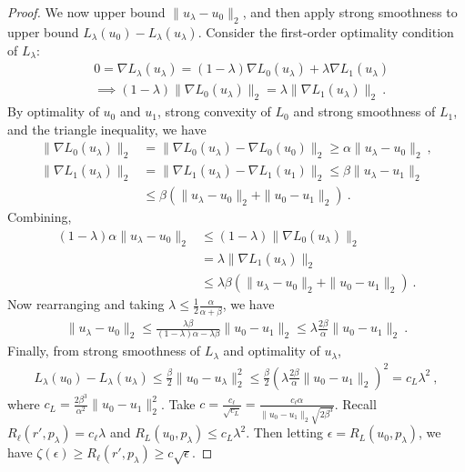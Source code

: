 \documentclass{article}
\theoremstyle{definition}\newtheorem{definition}{Definition}
\theoremstyle{definition}\newtheorem{assumption}{Assumption}
\begin{document}
\begin{proof}
  We now upper bound $\|u_\lambda - u_0\|_2$, and then apply strong smoothness to upper bound $L_\lambda(u_0) - L_\lambda(u_\lambda)$.
  Consider the first-order optimality condition of $L_\lambda$:
  \begin{align*}
    \label{eq:first-order-opt-smooth}
    & 0 = \nabla L_\lambda(u_\lambda) = (1-\lambda) \nabla L_0(u_\lambda) + \lambda \nabla L_1(u_\lambda)
    \\
    & \implies (1-\lambda) \|\nabla L_0(u_\lambda)\|_2 = \lambda \|\nabla L_1(u_\lambda)\|_2~.
  \end{align*}
  By optimality of $u_0$ and $u_1$, strong convexity of $L_0$ and strong smoothness of $L_1$, and the triangle inequality, we have
  \begin{align*}
    \|\nabla L_0(u_\lambda)\|_2 &= \|\nabla L_0(u_\lambda) - \nabla L_0(u_0)\|_2 \geq \alpha \|u_\lambda - u_0\|_2~,
    \\
    \|\nabla L_1(u_\lambda)\|_2 &= \|\nabla L_1(u_\lambda) - \nabla L_1(u_1)\|_2 \leq \beta \|u_\lambda - u_1\|_2
    \\
    &\leq \beta \left( \|u_\lambda - u_0\|_2 + \|u_0 - u_1\|_2 \right)~.
  \end{align*}
  Combining,
  \begin{align*}
    (1-\lambda) \alpha \|u_\lambda - u_0\|_2
    &\leq
      (1-\lambda) \|\nabla L_0(u_\lambda)\|_2
    \\
    &= \lambda \|\nabla L_1(u_\lambda)\|_2
    \\
    &\leq
      \lambda \beta \left( \|u_\lambda - u_0\|_2 + \|u_0 - u_1\|_2 \right)~.
  \end{align*}
  Now rearranging and taking $\lambda \leq \tfrac 1 2 \tfrac {\alpha}{\alpha+\beta}$, we have
  \begin{align*}
    \|u_\lambda - u_0\|_2 \leq \frac{\lambda\beta}{(1-\lambda)\alpha-\lambda\beta} \|u_0 - u_1\|_2  \leq \lambda \frac{2\beta}{\alpha} \|u_0 - u_1\|_2 ~.
  \end{align*}
  Finally, from strong smoothness of $L_\lambda$ and optimality of $u_\lambda$,
  \begin{align*}
    L_\lambda(u_0) - L_\lambda(u_\lambda) \leq \frac{\beta}{2} \|u_0 - u_\lambda\|_2^2 \leq \frac{\beta}{2} \left(\lambda \frac{2\beta}{\alpha} \|u_0 - u_1\|_2\right)^2 = c_L \lambda^2~,
  \end{align*}
  where $c_L = \frac{2\beta^3}{\alpha^2} \|u_0 - u_1\|_2^2$.
  Take $c = \frac{c_\ell}{\sqrt{c_L}} = \frac{c_\ell \alpha}{\|u_0 - u_1\|_2 \sqrt{2\beta^3}}$.
  Recall $R_\ell(r',p_\lambda) = c_\ell \lambda$ and $R_L(u_0,p_\lambda) \leq c_L \lambda^2$.
  Then letting $\epsilon = R_L(u_0,p_\lambda)$, we have $\zeta(\epsilon) \geq R_\ell(r',p_\lambda) \geq c \sqrt{\epsilon}$.
\end{proof}
\end{document}
